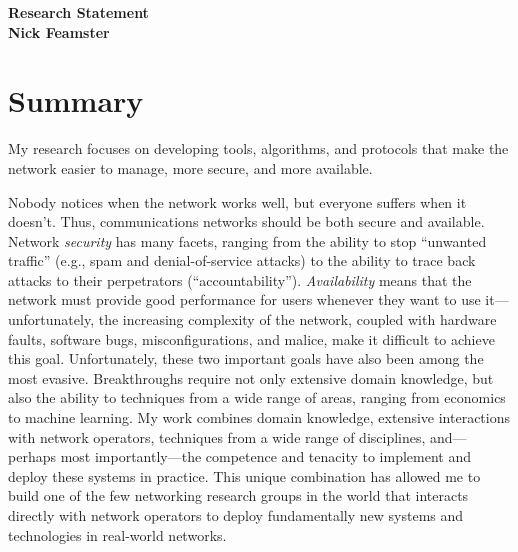 \newpage \setcounter{page}{1}


\begin{center}
{\Large\textbf{Research Statement}}\\[0.1in] {\large\textbf{Nick
Feamster}}\\
\end{center}

\section*{Summary}

My research focuses on developing tools, algorithms, and protocols that
make the network easier to manage, more secure, and more available.

Nobody notices when the network works well, but everyone suffers when it
doesn't.  Thus, communications networks should be both secure and
available.  Network {\em security} has many facets, ranging from the
ability to stop ``unwanted traffic'' (e.g., spam and denial-of-service
attacks) to the ability to trace back attacks to their perpetrators
(``accountability'').  {\em Availability} means that the network must
provide good performance for users whenever they want to use
it---unfortunately, the increasing complexity of the network, coupled
with hardware faults, software bugs, misconfigurations, and malice, make
it difficult to achieve this goal.  Unfortunately, these two important
goals have also been among the most evasive.  Breakthroughs require not
only extensive domain knowledge, but also the ability to techniques from
a wide range of areas, ranging from economics to machine learning.  My
work combines domain knowledge, extensive interactions with network
operators, techniques from a wide range of disciplines, and---perhaps
most importantly---the competence and tenacity to implement and deploy
these systems in practice.  This unique combination has allowed me to
build one of the few networking research groups in the world that
interacts directly with network operators to deploy fundamentally new
systems and technologies in real-world networks.

